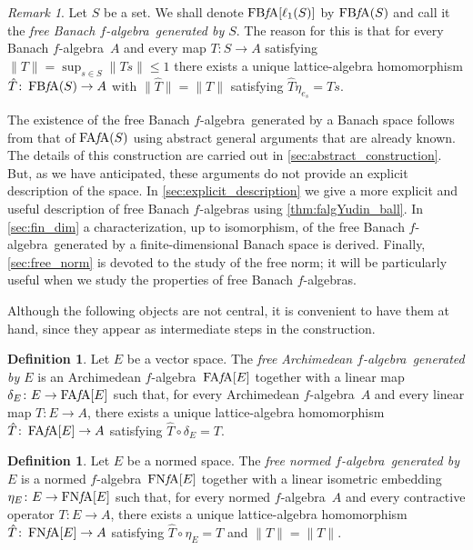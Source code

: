 \documentclass{memo-l}
\theoremstyle{definition}
\newtheorem{defn}[theorem]{Definition}
\theoremstyle{remark}
\newtheorem{rem}[theorem]{Remark}
\numberwithin{section}{chapter}
\numberwithin{equation}{chapter}
\newcommand{\el}[1]{\ensuremath{\ell_{#1}}}
\newcommand{\falg}{$f\!$-algebra}
\newcommand{\FAFA}[1]{\operatorname{FA{\it f}\!A}(#1)}
\newcommand{\FAFAv}[1]{\operatorname{FA{\it f}\!A}[#1]}
\newcommand{\FNFA}[1]{\operatorname{FN{\it f}\!A}[#1]}
\newcommand{\FBFA}[1]{\operatorname{FB{\it f}\!A}[#1]}
\newcommand{\FBFAs}[1]{\operatorname{FB{\it f}\!A}(#1)}
\begin{document}
\begin{rem}
    Let $S$ be a set. We shall denote $\FBFA{\el 1(S)}$ by $\FBFAs S$
    and call it the \emph{free Banach \falg\ generated by $S$}. The
    reason for this is that for every Banach \falg\ $A$ and every map
    $T\colon S\to A$ satisfying $\|T\|=\sup_{s \in S}\|Ts\|\le 1$
    there exists a unique lattice-algebra homomorphism $\hat{T}\colon
    \FBFAs S\to A$ with $\|\hat{T}\|=\|T\|$ satisfying $\hat{T}\eta
    _{e_s}=Ts$.
\end{rem}

The existence of the free Banach \falg\ generated by a Banach space follows from that of $\FAFA S$
using abstract general arguments that are already known. The details
of this construction are carried out in
\cref{sec:abstract_construction}. But, as we have anticipated, these arguments do not provide an explicit description of the space. In
\cref{sec:explicit_description} we give a more explicit and useful description of free
Banach \falg s using \cref{thm:falgYudin_ball}. In
\cref{sec:fin_dim} a
characterization, up to isomorphism, of the free Banach \falg\
generated by a finite-dimensional Banach space is derived. Finally,
\cref{sec:free_norm} is devoted to the study of the free norm; it will
be particularly useful when we study the properties of free Banach
\falg s.

Although the following objects are not central, it is
convenient to have them at hand, since
they appear as intermediate steps in the construction.

\begin{defn}
    Let $E$ be a vector space. The \emph{free Archimedean \falg\
    generated by $E$} is an Archimedean \falg\ $\FAFAv E$ together with a
    linear map $\delta_E \colon E\to \FAFAv E$ such that, for every
    Archimedean
    \falg\ $A$ and every linear map $T\colon E\to A$, there exists a
    unique lattice-algebra homomorphism $\hat{T}\colon \FAFAv E\to A$
    satisfying $\hat{T}\circ \delta _E=T$.
\end{defn}

\begin{defn}
    Let $E$ be a normed space. The \emph{free normed \falg\ generated
    by $E$} is a normed \falg\ $\FNFA E$ together with a linear isometric
    embedding $\eta _E \colon E\to \FNFA E$ such that, for every
    normed
    \falg\ $A$ and every contractive operator $T\colon E\to A$, there exists a
    unique lattice-algebra homomorphism $\hat{T}\colon \FNFA E\to A$
    satisfying $\hat{T}\circ \eta _E=T$ and $\|\hat{T}\|=\|T\|$.
\end{defn}
\end{document}
